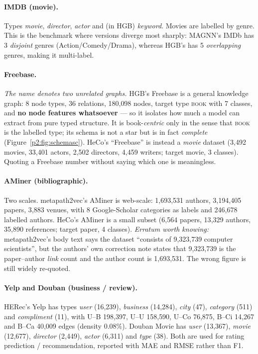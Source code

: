 \paragraph{IMDB (movie).} Types \emph{movie}, \emph{director}, \emph{actor} and (in HGB)
\emph{keyword}. Movies are labelled by genre. This is the benchmark where versions diverge most
sharply: MAGNN's IMDb has 3 \emph{disjoint} genres (Action/Comedy/Drama), whereas HGB's has 5
\emph{overlapping} genres, making it multi-label.

\paragraph{Freebase.} \emph{The name denotes two unrelated graphs.} HGB's Freebase is a general
knowledge graph: 8 node types, 36 relations, 180{,}098 nodes, target type \textsc{book} with 7
classes, and \textbf{no node features whatsoever} --- so it isolates how much a model can extract
from pure typed structure. It is book-\emph{centric} only in the sense that \textsc{book} is the
labelled type; its schema is not a star but is in fact \emph{complete}
(Figure~\ref{p2:fig:schemasc}). HeCo's ``Freebase'' is instead a \emph{movie}
dataset (3{,}492 movies, 33{,}401 actors, 2{,}502 directors, 4{,}459 writers; target movie, 3
classes). Quoting a Freebase number without saying which one is meaningless.

\paragraph{AMiner (bibliographic).} Two scales. metapath2vec's AMiner is web-scale: 1{,}693{,}531
authors, 3{,}194{,}405 papers, 3{,}883 venues, with 8 Google-Scholar categories as labels and
246{,}678 labelled authors. HeCo's AMiner is a small subset (6{,}564 papers, 13{,}329 authors,
35{,}890 references; target paper, 4 classes). \emph{Erratum worth knowing:} metapath2vec's body
text says the dataset ``consists of 9{,}323{,}739 computer scientists'', but the authors' own
correction note states that 9{,}323{,}739 is the paper--author \emph{link} count and the author
count is 1{,}693{,}531. The wrong figure is still widely re-quoted.

\paragraph{Yelp and Douban (business / review).} HERec's Yelp has types \emph{user} (16{,}239),
\emph{business} (14{,}284), \emph{city} (47), \emph{category} (511) and \emph{compliment} (11),
with U--B 198{,}397, U--U 158{,}590, U--Co 76{,}875, B--Ci 14{,}267 and B--Ca 40{,}009 edges
(density $0.08\%$). Douban Movie has \emph{user} (13{,}367), \emph{movie} (12{,}677),
\emph{director} (2{,}449), \emph{actor} (6{,}311) and \emph{type} (38). Both are used for
rating prediction / recommendation, reported with MAE and RMSE rather than F1.

